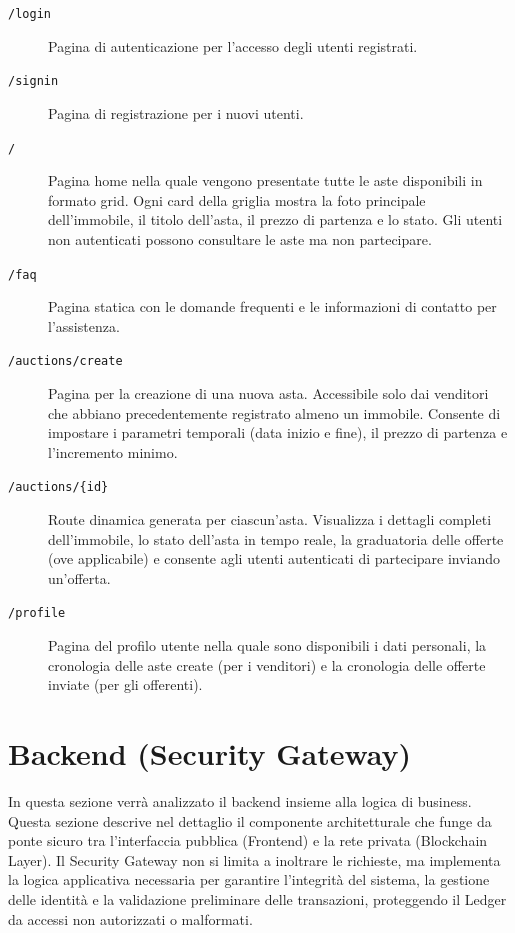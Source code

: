 \begin{description}
    \item[\texttt{/login}] Pagina di autenticazione per l'accesso degli utenti registrati.
    
    \item[\texttt{/signin}] Pagina di registrazione per i nuovi utenti.
    
    \item[\texttt{/}] Pagina home nella quale vengono presentate tutte le aste disponibili in formato grid. Ogni card della griglia mostra la foto principale dell'immobile, il titolo dell'asta, il prezzo di partenza e lo stato. Gli utenti non autenticati possono consultare le aste ma non partecipare.
    
    \item[\texttt{/faq}] Pagina statica con le domande frequenti e le informazioni di contatto per l'assistenza.
    
    \item[\texttt{/auctions/create}] Pagina per la creazione di una nuova asta. Accessibile solo dai venditori che abbiano precedentemente registrato almeno un immobile. Consente di impostare i parametri temporali (data inizio e fine), il prezzo di partenza e l'incremento minimo.
    
    \item[\texttt{/auctions/\{id\}}] Route dinamica generata per ciascun'asta. Visualizza i dettagli completi dell'immobile, lo stato dell'asta in tempo reale, la graduatoria delle offerte (ove applicabile) e consente agli utenti autenticati di partecipare inviando un'offerta.
    
    \item[\texttt{/profile}] Pagina del profilo utente nella quale sono disponibili i dati personali, la cronologia delle aste create (per i venditori) e la cronologia delle offerte inviate (per gli offerenti).
\end{description}

\newpage
\section{Backend (Security Gateway)}

In questa sezione verrà analizzato il backend insieme alla logica di business.
Questa sezione descrive nel dettaglio il componente architetturale che funge da ponte sicuro tra l'interfaccia pubblica (Frontend) e la rete privata (Blockchain Layer). Il Security Gateway non si limita a inoltrare le richieste, ma implementa la logica applicativa necessaria per garantire l'integrità del sistema, la gestione delle identità e la validazione preliminare delle transazioni, proteggendo il Ledger da accessi non autorizzati o malformati.


